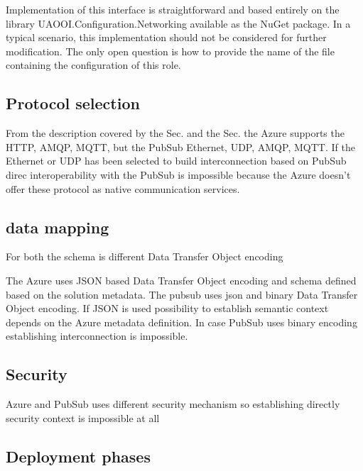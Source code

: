 \documentclass[
]{article}
\begin{document}
Implementation of this interface is straightforward and based entirely
on the library UAOOI.Configuration.Networking available as the NuGet
package. In a typical scenario, this implementation should not be
considered for further modification. The only open question is how to
provide the name of the file containing the configuration of this role.

\hypertarget{protocol-selection}{%
\subsection{Protocol selection}\label{protocol-selection}}

From the description covered by the Sec. and the Sec. the Azure supports
the HTTP, AMQP, MQTT, but the PubSub Ethernet, UDP, AMQP, MQTT. If the
Ethernet or UDP has been selected to build interconnection based on
PubSub direc interoperability with the PubSub is impossible because the
Azure doesn't offer these protocol as native communication services.

\hypertarget{data-mapping}{%
\subsection{data mapping}\label{data-mapping}}

For both the schema is different Data Transfer Object encoding

The Azure uses JSON based Data Transfer Object encoding and schema
defined based on the solution metadata. The pubsub uses json and binary
Data Transfer Object encoding. If JSON is used possibility to establish
semantic context depends on the Azure metadata definition. In case
PubSub uses binary encoding establishing interconnection is impossible.

\hypertarget{security}{%
\subsection{Security}\label{security}}

Azure and PubSub uses different security mechanism so establishing
directly security context is impossible at all

\hypertarget{deployment-phases}{%
\subsection{Deployment phases}\label{deployment-phases}}
\end{document}
